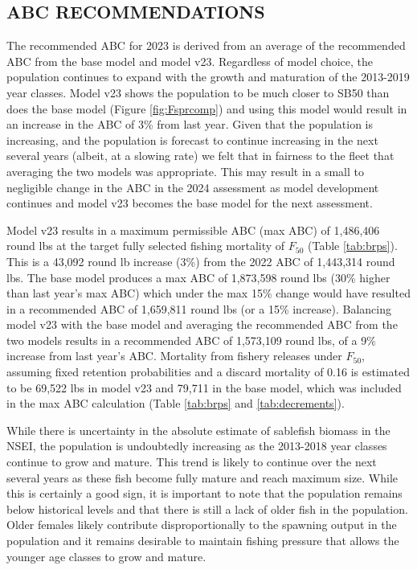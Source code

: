\documentclass[
]{article}
\begin{document}
\hypertarget{abc-recommendations}{%
\subsection{ABC RECOMMENDATIONS}\label{abc-recommendations}}

The recommended ABC for 2023 is derived from an average of the recommended ABC from the base model and model v23. Regardless of model choice, the population continues to expand with the growth and maturation of the 2013-2019 year classes. Model v23 shows the population to be much closer to SB50 than does the base model (Figure \ref{fig:Fsprcomp}) and using this model would result in an increase in the ABC of 3\% from last year. Given that the population is increasing, and the population is forecast to continue increasing in the next several years (albeit, at a slowing rate) we felt that in fairness to the fleet that averaging the two models was appropriate. This may result in a small to negligible change in the ABC in the 2024 assessment as model development continues and model v23 becomes the base model for the next assessment.

Model v23 results in a maximum permissible ABC (max ABC) of 1,486,406 round lbs at the target fully selected fishing mortality of \(F_{50}\) (Table \ref{tab:brps}). This is a 43,092 round lb increase (3\%) from the 2022 ABC of 1,443,314 round lbs. The base model produces a max ABC of 1,873,598 round lbs (30\% higher than last year's max ABC) which under the max 15\% change would have resulted in a recommended ABC of 1,659,811 round lbs (or a 15\% increase). Balancing model v23 with the base model and averaging the recommended ABC from the two models results in a recommended ABC of 1,573,109 round lbs, of a 9\% increase from last year's ABC. Mortality from fishery releases under \(F_{50}\), assuming fixed retention probabilities and a discard mortality of 0.16 is estimated to be 69,522 lbs in model v23 and 79,711 in the base model, which was included in the max ABC calculation (Table \ref{tab:brps} and \ref{tab:decrements}).

While there is uncertainty in the absolute estimate of sablefish biomass in the NSEI, the population is undoubtedly increasing as the 2013-2018 year classes continue to grow and mature. This trend is likely to continue over the next several years as these fish become fully mature and reach maximum size. While this is certainly a good sign, it is important to note that the population remains below historical levels and that there is still a lack of older fish in the population. Older females likely contribute disproportionally to the spawning output in the population and it remains desirable to maintain fishing pressure that allows the younger age classes to grow and mature.
\end{document}
